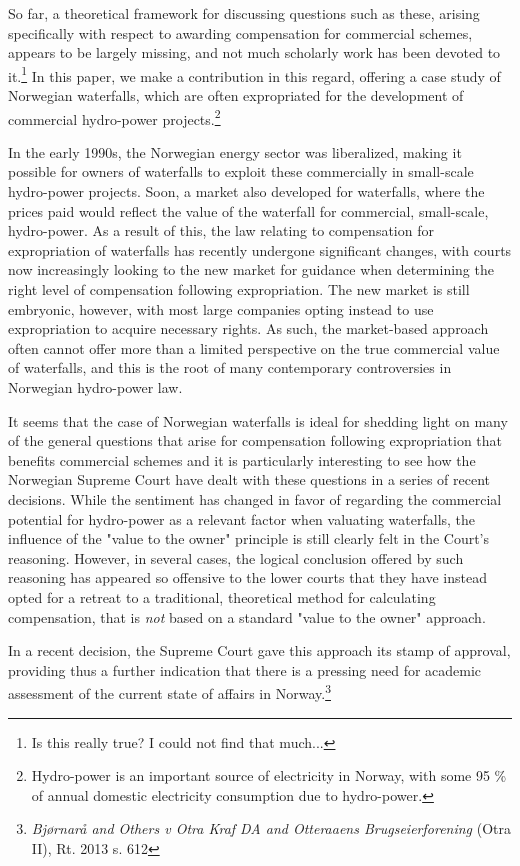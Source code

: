 So far, a theoretical framework for discussing questions such as these, arising specifically with respect to awarding compensation for commercial schemes, appears to be largely missing, and not much scholarly work has been devoted to it.\footnote{Is this really true? I could not find that much...} In this paper, we make a contribution in this regard, offering a case study of Norwegian waterfalls, which are often expropriated for the development of commercial hydro-power projects.\footnote{Hydro-power is an important source of electricity in Norway, with some 95 \% of annual domestic electricity consumption due to hydro-power.} 

In the early 1990s, the Norwegian energy sector was liberalized, making it possible for owners of waterfalls to exploit these commercially in small-scale hydro-power projects. Soon, a market also developed for waterfalls, where the prices paid would reflect the value of the waterfall for commercial, small-scale, hydro-power. As a result of this, the law relating to compensation for expropriation of waterfalls has recently undergone significant changes, with courts now increasingly looking to the new market for guidance when determining the right level of compensation following expropriation. The new market is still embryonic, however, with most large companies opting instead to use expropriation to acquire necessary rights. As such, the market-based approach often cannot offer more than a limited perspective on the true commercial value of waterfalls, and this is the root of many contemporary controversies in Norwegian hydro-power law.

It seems that the case of Norwegian waterfalls is ideal for shedding light on many of the general questions that arise for compensation following expropriation that benefits commercial schemes and it is particularly interesting to see how the Norwegian Supreme Court have dealt with these questions in a series of recent decisions. While the sentiment has changed in favor of regarding the commercial potential for hydro-power as a relevant factor when valuating waterfalls, the influence of the "value to the owner" principle is still clearly felt in the Court's reasoning. However, in several cases, the logical conclusion offered by such reasoning has appeared so offensive to the lower courts that they have instead opted for a retreat to a traditional, theoretical method for calculating compensation, that is \emph{not} based on a standard "value to the owner" approach.

In a recent decision, the Supreme Court gave this approach its stamp of approval, providing thus a further indication that there is a pressing need for academic assessment of the current state of affairs in Norway.\footnote{\emph{Bjørnarå and Others v Otra Kraf DA and Otteraaens Brugseierforening} (Otra II), Rt. 2013 s. 612}

